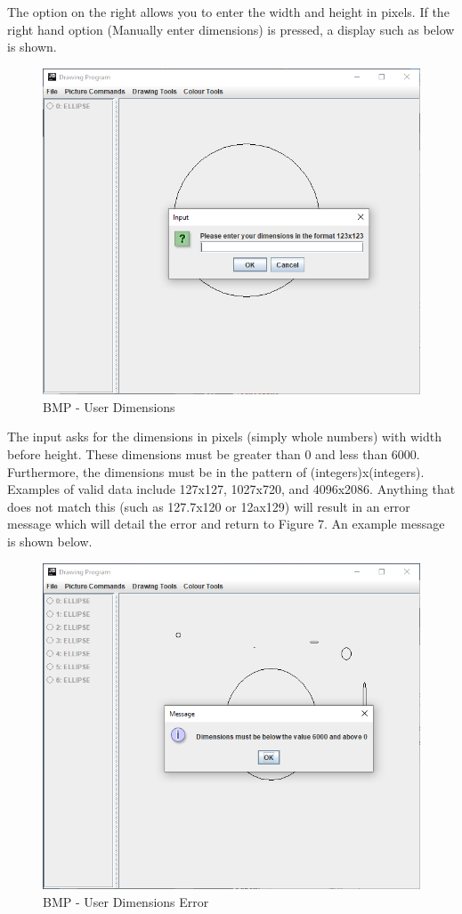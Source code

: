 \documentclass[12pt]{article} %
\begin{document}
The option on the right allows you to enter the width and height in pixels. If the right hand option (Manually enter dimensions) is pressed, a display such as below is shown.


\begin{figure}[H]
\caption{BMP - User Dimensions}
\centering
\includegraphics[scale=0.75]{pictures/bmpSecondWindow.PNG}
\end{figure}


The input asks for the dimensions in pixels (simply whole numbers) with width before height. These dimensions must be greater than 0 and less than 6000. Furthermore, the dimensions must be in the pattern of (integers)x(integers). Examples of valid data include 127x127, 1027x720, and 4096x2086. Anything that does not match this (such as 127.7x120 or 12ax129) will result in an error message which will detail the error and return to Figure 7. An example message is shown below.

\begin{figure}[H]
\caption{BMP - User Dimensions Error}
\centering
\includegraphics[scale=0.75]{pictures/bmpThirdWindow.PNG}
\end{figure}
\end{document}
